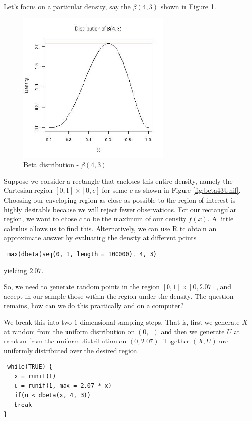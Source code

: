 Let's focus on a
particular density, say the $\beta(4, 3)$ shown in Figure
\ref{fig:beta43}.

\begin{figure}[htbp]
  \begin{center}
    \leavevmode
    \includegraphics[width=3in]{RNG/images/beta43Unif.jpg}
    \caption{Beta distribution - $\beta(4, 3)$}
    \label{fig:beta43}
  \end{center}
\end{figure}

Suppose we consider a rectangle that encloses this entire density,
namely the Cartesian region $[0,1] \times [0, c]$ for some $c$ as
shown in Figure \ref{fig:beta43Unif}.
Choosing our enveloping region as
close as possible to the region of interest  is highly desirable
because we will reject fewer observations. 
For our rectangular region, we want to chose $c$ to be the 
maximum of our density $f(x)$.  A little calculus allows us to find this.
Alternatively, we can use R to obtain an approximate answer
by evaluating the density at different points 
\begin{verbatim}
 max(dbeta(seq(0, 1, length = 100000), 4, 3)
\end{verbatim}
yielding $2.07$.

So, we need to generate random points in the region
 $[0, 1] \times [0,  2.07]$, and accept in our sample
those within the region under the density.  The question remains,
how can we do this practically and on a computer?

We break this
into two $1$ dimensional sampling steps. That is,
first we generate $X$ at random from the uniform distribution on 
$(0,1)$ and then we generate $U$ at random from the uniform
distribution on $(0, 2.07)$.  Together $(X, U)$ are uniformly
distributed over the desired region. 
\begin{verbatim}
 while(TRUE) {
   x = runif(1)
   u = runif(1, max = 2.07 * x)
   if(u < dbeta(x, 4, 3))
   break
}
\end{verbatim}

